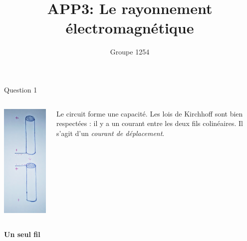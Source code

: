 \documentclass{beamer}
\title{APP3: Le rayonnement électromagnétique}
\author{Groupe 1254}
\begin{document}
\begin{frame}
	\maketitle
\end{frame}
\begin{frame}{Question 1}
	\begin{columns}
		\begin{column}{0.40\textwidth}
			\begin{center}
	    		\includegraphics[scale=0.3, angle=90]{question1.png}
        		\end{center}
		\end{column}
		\begin{column}{0.40\textwidth}
		Le circuit forme une capacité.
		Les lois de Kirchhoff sont bien respectées : il y a un courant entre les deux fils colinéaires. Il s'agit 			d'un \emph{courant de déplacement}.
		\end{column}
	\end{columns}
	\begin{center}\textbf{Un seul fil}\end{center}
\end{frame}
\end{document}
